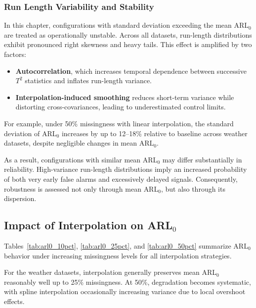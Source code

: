 \subsubsection{Run Length Variability and Stability}

In this chapter, configurations with standard deviation exceeding the mean \ac{ARL}$_0$ are treated as operationally unstable.
Across all datasets, run-length distributions exhibit pronounced right skewness and heavy tails. This effect is amplified by two factors:

\begin{itemize}
\item \textbf{Autocorrelation}, which increases temporal dependence between successive $T^2$ statistics and inflates run-length variance.
\item \textbf{Interpolation-induced smoothing} reduces short-term variance while distorting cross-covariances, leading to underestimated control limits.
\end{itemize}

For example, under 50\% missingness with linear interpolation, the standard deviation of \ac{ARL}$_0$ increases by up to 12–18\% relative to baseline across weather datasets, despite negligible changes in mean \ac{ARL}$_0$.

As a result, configurations with similar mean \ac{ARL}$_0$ may differ substantially in reliability. High-variance run-length distributions imply an increased probability of both very early false alarms and excessively delayed signals. Consequently, robustness is assessed not only through mean \ac{ARL}$_0$, but also through its dispersion.



\subsection{Impact of Interpolation on \ac{ARL}$_0$}

Tables~\ref{tab:arl0_10pct}, \ref{tab:arl0_25pct}, and \ref{tab:arl0_50pct} summarize \ac{ARL}$_0$ behavior under increasing missingness levels for all interpolation strategies.

For the weather datasets, interpolation generally preserves mean \ac{ARL}$_0$ reasonably well up to 25\% missingness. At 50\%, degradation becomes systematic, with spline interpolation occasionally increasing variance due to local overshoot effects.

